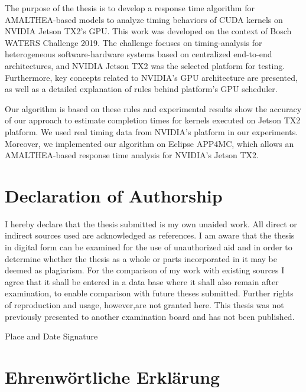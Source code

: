\documentclass[
  12pt,
  a4paperpaper,
]{report}
\begin{document}
The purpose of the thesis is to develop a response time algorithm for
AMALTHEA-based models to analyze timing behaviors of CUDA kernels on
NVIDIA Jetson TX2's GPU. This work was developed on the context of Bosch
WATERS Challenge 2019. The challenge focuses on timing-analysis for
heterogeneous software-hardware systems based on centralized end-to-end
architectures, and NVIDIA Jetson TX2 was the selected platform for
testing. Furthermore, key concepts related to NVIDIA's GPU architecture
are presented, as well as a detailed explanation of rules behind
platform's GPU scheduler.

Our algorithm is based on these rules and experimental results show
the accuracy of our approach to estimate completion times for kernels
executed on Jetson TX2 platform. We used real timing data from NVIDIA's
platform in our experiments. Moreover, we implemented our
algorithm on Eclipse APP4MC, which allows an AMALTHEA-based response time
analysis for NVIDIA's Jetson TX2.

\setcounter{page}{1}

\hypertarget{declaration-of-authorship}{%
\chapter*{Declaration of Authorship}\label{declaration-of-authorship}}

I hereby declare that the thesis submitted is my own unaided work. All
direct or indirect sources used are acknowledged as references. I am
aware that the thesis in digital form can be examined for the use of
unauthorized aid and in order to determine whether the thesis as a whole
or parts incorporated in it may be deemed as plagiarism. For the
comparison of my work with existing sources I agree that it shall be
entered in a data base where it shall also remain after examination, to
enable comparison with future theses submitted. Further rights of
reproduction and usage, however,are not granted here. This thesis was
not previously presented to another examination board and has not been
published.

Place and Date
\quad\quad\quad\quad\quad\quad\quad\quad\quad\quad\quad\quad\quad\quad Signature

\hypertarget{ehrenwuxf6rtliche-erkluxe4rung}{%
\chapter*{Ehrenwörtliche
Erklärung}\label{ehrenwuxf6rtliche-erkluxe4rung}}
\end{document}
